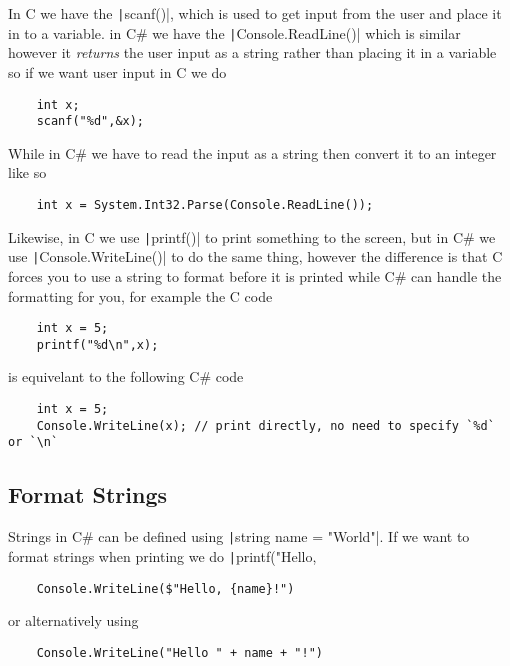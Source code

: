 \documentclass{report}
\begin{document}
In C we have the \texttt|scanf()|, which is used to get input from the user and place it in to a variable. in C\# we have the \texttt|Console.ReadLine()| which is similar however it \emph{returns} the user input as a string rather than placing it in a variable so if we want user input in C we do
\begin{verbatim}
    int x;
    scanf("%d",&x);
\end{verbatim}

While in C\# we have to read the input as a string then convert it to an integer like so

\begin{verbatim}
    int x = System.Int32.Parse(Console.ReadLine());
\end{verbatim}

Likewise, in C we use \texttt|printf()| to print something to the screen, but in C\# we use \texttt|Console.WriteLine()| to do the same thing, however the difference is that C forces you to use a string to format before it is printed while C\# can handle the formatting for you, for example the C code
\begin{verbatim}
    int x = 5;
    printf("%d\n",x);
\end{verbatim}
is equivelant to the following C\# code

\begin{verbatim}
    int x = 5;
    Console.WriteLine(x); // print directly, no need to specify `%d` or `\n`
\end{verbatim}

\subsection{Format Strings}
Strings in C\# can be defined using \texttt|string name = "World"|. If we want to format strings when printing we do \texttt|printf("Hello, %

\begin{verbatim}
    Console.WriteLine($"Hello, {name}!")
\end{verbatim}
or alternatively using
\begin{verbatim}
    Console.WriteLine("Hello " + name + "!")
\end{verbatim}


\end{document}
